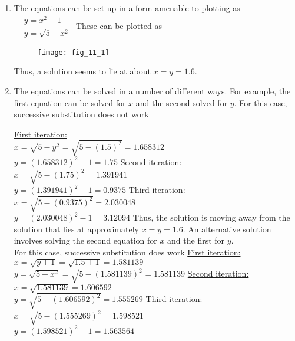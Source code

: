 \documentclass[../main.tex]{subfiles}
\begin{document}
\section{}
\begin{enumerate}[label=\bfseries(\alph*)]
\item The equations can be set up in a form amenable to plotting as
\bigbreak
$\begin{aligned}
&y=x^{2}-1 \\
&y=\sqrt{5-x^{2}}
\end{aligned}$
\bigbreak
These can be plotted as
\bigbreak
\begin{figure}[H]
		\texttt{[image: fig\_11\_1]}
		\label{fig:fig_11_1}
	\end{figure}
\bigbreak
Thus, a solution seems to lie at about $x=y=1.6$.
\bigbreak

\item The equations can be solved in a number of different ways. For example, the first equation can be solved for $x$ and the second solved for $y$. For this case, successive substitution does not work
\bigbreak

\underline{First iteration:}\\
$x=\sqrt{5-y^{2}}=\sqrt{5-(1.5)^{2}}=1.658312$
\\
$y=(1.658312)^{2}-1=1.75$
\bigbreak
\underline{Second iteration:}\\
$x=\sqrt{5-(1.75)^{2}}=1.391941$
\\
$y=(1.391941)^{2}-1=0.9375$
\bigbreak
\underline{Third iteration:}\\
$x=\sqrt{5-(0.9375)^{2}}=2.030048$
\\
$y=(2.030048)^{2}-1=3.12094$
\bigbreak
Thus, the solution is moving away from the solution that lies at approximately $x=y=1.6$.
\bigbreak
An alternative solution involves solving the second equation for $x$ and the first for $y$.\\ For this case, successive substitution does work
\bigbreak
\underline{First iteration:}\\
$x=\sqrt{y+1}=\sqrt{1.5+1}=1.581139$
\\
$y=\sqrt{5-x^{2}}=\sqrt{5-(1.581139)^{2}}=1.581139$
\bigbreak
\underline{Second iteration:}\\
$x=\sqrt{1.581139}=1.606592$
\\
$y=\sqrt{5-(1.606592)^{2}}=1.555269$
\bigbreak
\underline{Third iteration:}\\
$x=\sqrt{5-(1.555269)^{2}}=1.598521$ 
\\
$y=(1.598521)^{2}-1=1.563564$


\end{enumerate}
\end{document}
